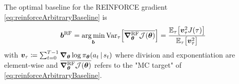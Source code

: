 			\begin{theorem}
				The optimal baseline for the REINFORCE gradient \eqref{eq:reinforceArbitraryBaseline} is
				\begin{equation}
					\bm{b}^\mathrm{RF}
					= \operatorname*{arg\,min}_{\bm{b}} \operatorname{Var}_\tau\Bigl[ \overline{\grad_{\bm{\theta}}^\mathrm{RF} \mathcal{J}(\bm{\theta})} \Bigr]
					= \frac{\mathbb{E}_\tau\bigl[ \bm{v}_\tau^2 J(\tau) \bigr]}{\mathbb{E}_\tau\bigl[ \bm{v}_\tau^2 \bigr]}
					\label{eq:reinforceOptimalBaseline}
				\end{equation}
				with \( \bm{v}_\tau \coloneqq  \sum_{t = 0}^{T - 1} \grad_{\bm{\theta}} \log \pi_{\bm{\theta}}(a_t \,\vert\, s_t) \) where division and exponentiation are element-wise and \( \overline{\grad_{\bm{\theta}}^\mathrm{RF} \mathcal{J}(\bm{\theta})} \) refers to the "\ac{MC} target" of \eqref{eq:reinforceArbitraryBaseline}.
			\end{theorem}
